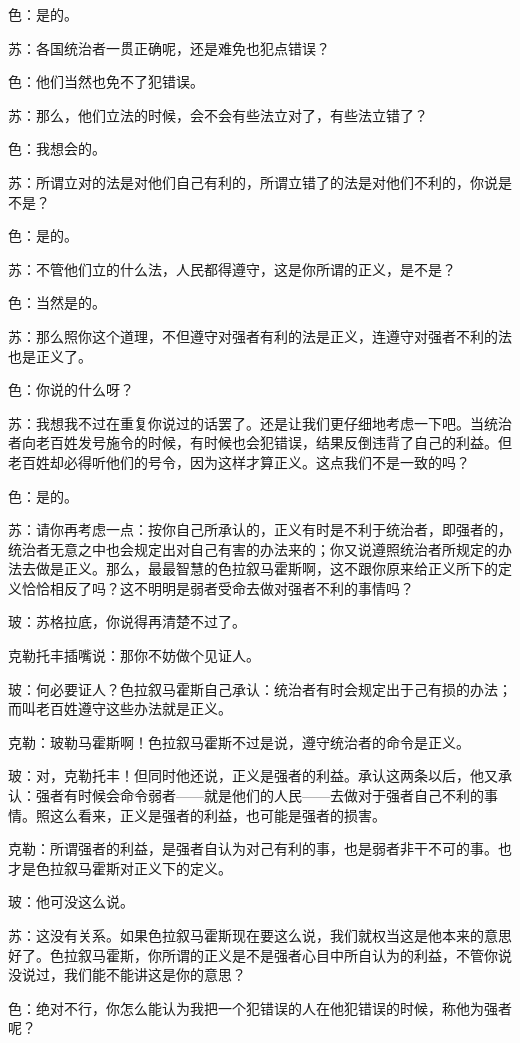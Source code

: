 \documentclass[12pt,oneside]{book}
\begin{document}
色：是的。

苏：各国统治者一贯正确呢，还是难免也犯点错误？

色：他们当然也免不了犯错误。

苏：那么，他们立法的时候，会不会有些法立对了，有些法立错了？

色：我想会的。

苏：所谓立对的法是对他们自己有利的，所谓立错了的法是对他们不利的，你说是不是？

色：是的。

苏：不管他们立的什么法，人民都得遵守，这是你所谓的正义，是不是？

色：当然是的。

苏：那么照你这个道理，不但遵守对强者有利的法是正义，连遵守对强者不利的法也是正义了。

色：你说的什么呀？

苏：我想我不过在重复你说过的话罢了。还是让我们更仔细地考虑一下吧。当统治者向老百姓发号施令的时候，有时候也会犯错误，结果反倒违背了自己的利益。但老百姓却必得听他们的号令，因为这样才算正义。这点我们不是一致的吗？

色：是的。

苏：请你再考虑一点：按你自己所承认的，正义有时是不利于统治者，即强者的，统治者无意之中也会规定出对自己有害的办法来的；你又说遵照统治者所规定的办法去做是正义。那么，最最智慧的色拉叙马霍斯啊，这不跟你原来给正义所下的定义恰恰相反了吗？这不明明是弱者受命去做对强者不利的事情吗？

玻：苏格拉底，你说得再清楚不过了。

克勒托丰插嘴说：那你不妨做个见证人。

玻：何必要证人？色拉叙马霍斯自己承认：统治者有时会规定出于己有损的办法；而叫老百姓遵守这些办法就是正义。

克勒：玻勒马霍斯啊！色拉叙马霍斯不过是说，遵守统治者的命令是正义。

玻：对，克勒托丰！但同时他还说，正义是强者的利益。承认这两条以后，他又承认：强者有时候会命令弱者——就是他们的人民——去做对于强者自己不利的事情。照这么看来，正义是强者的利益，也可能是强者的损害。

克勒：所谓强者的利益，是强者自认为对己有利的事，也是弱者非干不可的事。也才是色拉叙马霍斯对正义下的定义。

玻：他可没这么说。

苏：这没有关系。如果色拉叙马霍斯现在要这么说，我们就权当这是他本来的意思好了。色拉叙马霍斯，你所谓的正义是不是强者心目中所自认为的利益，不管你说没说过，我们能不能讲这是你的意思？

色：绝对不行，你怎么能认为我把一个犯错误的人在他犯错误的时候，称他为强者呢？
\end{document}
